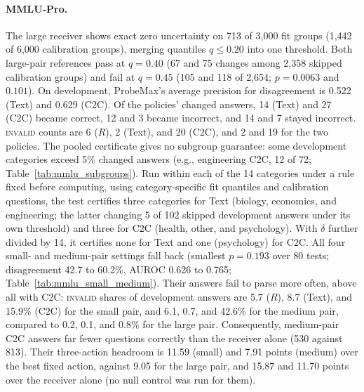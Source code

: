 \paragraph{MMLU-Pro.}\label{app:mmlu} The large receiver shows exact zero uncertainty on 713 of 3,000 fit groups (1,442 of 6,000 calibration groups), merging quantiles $q\le0.20$ into one threshold. Both large-pair references pass at $q=0.40$ (67 and 75 changes among 2,358 skipped calibration groups) and fail at $q=0.45$ (105 and 118 of 2,654; $p=0.0063$ and $0.101$). On development, ProbeMax's average precision for disagreement is 0.522 (Text) and 0.629 (C2C). Of the policies' changed answers, 14 (Text) and 27 (C2C) became correct, 12 and 3 became incorrect, and 14 and 7 stayed incorrect. \textsc{invalid} counts are 6 ($R$), 2 (Text), and 20 (C2C), and 2 and 19 for the two policies. The pooled certificate gives no subgroup guarantee: some development categories exceed 5\% changed answers (e.g., engineering C2C, 12 of 72; Table~\ref{tab:mmlu_subgroups}). Run within each of the 14 categories under a rule fixed before computing, using category-specific fit quantiles and calibration questions, the test certifies three categories for Text (biology, economics, and engineering; the latter changing 5 of 102 skipped development answers under its own threshold) and three for C2C (health, other, and psychology). With $\delta$ further divided by 14, it certifies none for Text and one (psychology) for C2C. All four small- and medium-pair settings fall back (smallest $p=0.193$ over 80 tests; disagreement 42.7 to 60.2\%, AUROC 0.626 to 0.765; Table~\ref{tab:mmlu_small_medium}). Their answers fail to parse more often, above all with C2C: \textsc{invalid} shares of development answers are 5.7 ($R$), 8.7 (Text), and 15.9\% (C2C) for the small pair, and 6.1, 0.7, and 42.6\% for the medium pair, compared to 0.2, 0.1, and 0.8\% for the large pair. Consequently, medium-pair C2C answers far fewer questions correctly than the receiver alone (530 against 813). Their three-action headroom is 11.59 (small) and 7.91 points (medium) over the best fixed action, against 9.05 for the large pair, and 15.87 and 11.70 points over the receiver alone (no null control was run for them).

